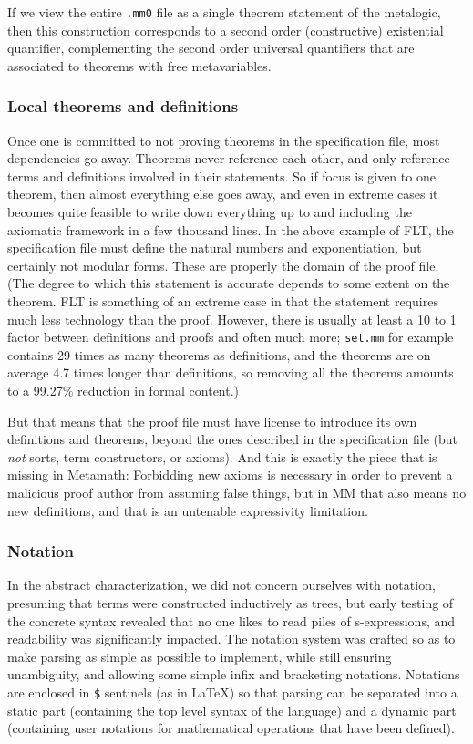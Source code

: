 \documentclass[runningheads]{llncs}
\begin{document}
If we view the entire \texttt{.mm0} file as a single theorem statement of the metalogic, then this construction corresponds to a second order (constructive) existential quantifier, complementing the second order universal quantifiers that are associated to theorems with free metavariables.

\subsubsection{Local theorems and definitions}
Once one is committed to not proving theorems in the specification file, most dependencies go away. Theorems never reference each other, and only reference terms and definitions involved in their statements. So if focus is given to one theorem, then almost everything else goes away, and even in extreme cases it becomes quite feasible to write down everything up to and including the axiomatic framework in a few thousand lines. In the above example of FLT, the specification file must define the natural numbers and exponentiation, but certainly not modular forms. These are properly the domain of the proof file. (The degree to which this statement is accurate depends to some extent on the theorem. FLT is something of an extreme case in that the statement requires much less technology than the proof. However, there is usually at least a 10 to 1 factor between definitions and proofs and often much more; \texttt{set.mm} for example contains 29 times as many theorems as definitions, and the theorems are on average 4.7 times longer than definitions, so removing all the theorems amounts to a 99.27\% reduction in formal content.)

But that means that the proof file must have license to introduce its own definitions and theorems, beyond the ones described in the specification file (but \emph{not} sorts, term constructors, or axioms). And this is exactly the piece that is missing in Metamath: Forbidding new axioms is necessary in order to prevent a malicious proof author from assuming false things, but in MM that also means no new definitions, and that is an untenable expressivity limitation.

\subsubsection{Notation}
In the abstract characterization, we did not concern ourselves with notation, presuming that terms were constructed inductively as trees, but early testing of the concrete syntax revealed that no one likes to read piles of s-expressions, and readability was significantly impacted. The notation system was crafted so as to make parsing as simple as possible to implement, while still ensuring unambiguity, and allowing some simple infix and bracketing notations. Notations are enclosed in \texttt{\$} sentinels (as in \LaTeX) so that parsing can be separated into a static part (containing the top level syntax of the language) and a dynamic part (containing user notations for mathematical operations that have been defined).
\end{document}
